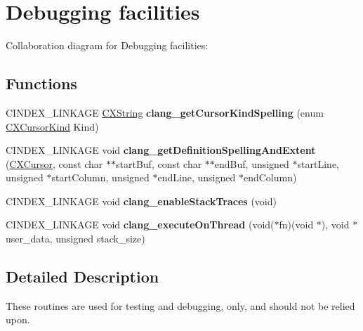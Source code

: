 \hypertarget{group__CINDEX__DEBUG}{}\section{Debugging facilities}
\label{group__CINDEX__DEBUG}
Collaboration diagram for Debugging facilities\+:
\subsection*{Functions}
\begin{DoxyCompactItemize}
\item 
\mbox{\label{group__CINDEX__DEBUG_ga7a4eecfc1b343568cb9ea447cbde08a8}} 
C\+I\+N\+D\+E\+X\+\_\+\+L\+I\+N\+K\+A\+GE \hyperlink{structCXString}{C\+X\+String} {\bfseries clang\+\_\+get\+Cursor\+Kind\+Spelling} (enum \hyperlink{group__CINDEX_gaaccc432245b4cd9f2d470913f9ef0013}{C\+X\+Cursor\+Kind} Kind)
\item 
\mbox{\label{group__CINDEX__DEBUG_ga707dccd8978d58267923359b5b9a0701}} 
C\+I\+N\+D\+E\+X\+\_\+\+L\+I\+N\+K\+A\+GE void {\bfseries clang\+\_\+get\+Definition\+Spelling\+And\+Extent} (\hyperlink{structCXCursor}{C\+X\+Cursor}, const char $\ast$$\ast$start\+Buf, const char $\ast$$\ast$end\+Buf, unsigned $\ast$start\+Line, unsigned $\ast$start\+Column, unsigned $\ast$end\+Line, unsigned $\ast$end\+Column)
\item 
\mbox{\label{group__CINDEX__DEBUG_ga66eec2931642afdf8b13a81447d5022d}} 
C\+I\+N\+D\+E\+X\+\_\+\+L\+I\+N\+K\+A\+GE void {\bfseries clang\+\_\+enable\+Stack\+Traces} (void)
\item 
\mbox{\label{group__CINDEX__DEBUG_ga80c2e471ea922c1bfda2bdd3438c7cdc}} 
C\+I\+N\+D\+E\+X\+\_\+\+L\+I\+N\+K\+A\+GE void {\bfseries clang\+\_\+execute\+On\+Thread} (void($\ast$fn)(void $\ast$), void $\ast$user\+\_\+data, unsigned stack\+\_\+size)
\end{DoxyCompactItemize}


\subsection{Detailed Description}
These routines are used for testing and debugging, only, and should not be relied upon. 
